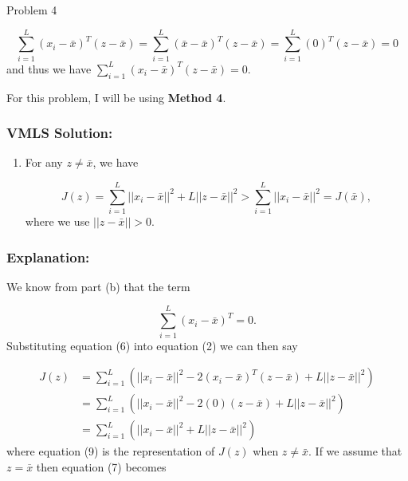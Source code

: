 \begin{problem}{Problem 4}
\begin{Highlight}
        \begin{equation}
            \sum^{L}_{i = 1} (x_{i} - \bar{x})^{T}(z - \bar{x}) = \sum^{L}_{i = 1} (\bar{x} - \bar{x})^{T}(z - \bar{x}) = \sum^{L}_{i = 1} (0)^{T}(z - \bar{x}) = 0
        \end{equation}
        and thus we have $\sum^{L}_{i = 1}(x_{i} - \bar{x})^{T}(z - \bar{x}) = 0$.
    \end{Highlight}

    \begin{Highlight}
        \noindent For this problem, I will be using \textbf{Method 4}. 

        \subsubsection*{VMLS Solution:}

        \begin{enumerate}[label = (\alph*), start = 3]
            \item For any $z \neq \bar{x}$, we have
            
            \begin{equation*}
                J(z) = \sum^{L}_{i = 1}||x_{i} - \bar{x}||^{2} + L||z - \bar{x}||^{2} > \sum^{L}_{i = 1} ||x_{i} - \bar{x}||^{2} = J(\bar{x}),
            \end{equation*}
            where we use $||z - \bar{x}|| > 0$.
        \end{enumerate}

        \subsubsection*{Explanation:}

        We know from part (b) that the term 

        \begin{equation}
            \sum^{L}_{i = 1} (x_{i} - \bar{x})^{T} = 0.
        \end{equation}
        Substituting equation (6) into equation (2) we can then say 

        \begin{align}
            J(z) & = \sum^{L}_{i = 1} (||x_{i} - \bar{x}||^{2} - 2(x_{i} - \bar{x})^{T}(z - \bar{x}) + L||z - \bar{x}||^{2}) \\
            & = \sum^{L}_{i = 1} (||x_{i} - \bar{x}||^{2} - 2(0)(z - \bar{x}) + L||z - \bar{x}||^{2}) \\
            & = \sum^{L}_{i = 1} (||x_{i} - \bar{x}||^{2} + L||z - \bar{x}||^{2})
        \end{align}
        where equation (9) is the representation of $J(z)$ when $z \neq \bar{x}$. If we assume that $z = \bar{x}$ then equation (7) becomes 


\end{Highlight}
\end{problem}
